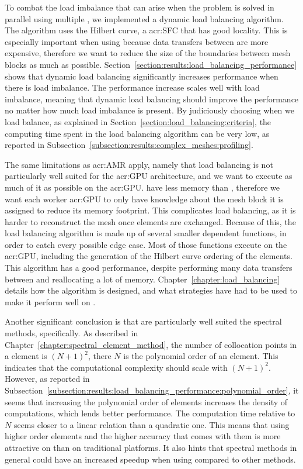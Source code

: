 To combat the load imbalance that can arise when the problem is solved in parallel using multiple
, we implemented a dynamic load balancing algorithm. The algorithm uses the
Hilbert curve, a \acrlong{acr:SFC} that has good locality. This is especially important when using
 because data transfers between  are more expensive,
therefore we want to reduce the size of the boundaries between mesh blocks as much as possible.
Section~\ref{section:results:load_balancing_performance} shows that dynamic load balancing
significantly increases performance when there is load imbalance. The performance increase scales
well with load imbalance, meaning that dynamic load balancing should improve the performance no
matter how much load imbalance is present. By judiciously choosing when we load balance, as
explained in Section~\ref{section:load_balancing:criteria}, the computing time spent in the load
balancing algorithm can be very low, as reported in
Subsection~\ref{subsection:results:complex_meshes:profiling}. 

The same limitations as \acrshort{acr:AMR} apply, namely that load balancing is not particularly
well suited for the \acrshort{acr:GPU} architecture, and we want to execute as much of it as
possible on the \acrshort{acr:GPU}.  have less memory than ,
therefore we want each worker \acrshort{acr:GPU} to only have knowledge about the mesh block it is
assigned to reduce its memory footprint. This complicates load balancing, as it is harder to
reconstruct the mesh once elements are exchanged. Because of this, the load balancing algorithm is
made up of several smaller dependent functions, in order to catch every possible edge case. Most of
those functions execute on the \acrshort{acr:GPU}, including the generation of the Hilbert curve
ordering of the elements. This algorithm has a good performance, despite performing many data
transfers between  and reallocating a lot of memory.
Chapter~\ref{chapter:load_balancing} details how the algorithm is designed, and what strategies have
had to be used to make it perform well on .

Another significant conclusion is that  are particularly well suited the
spectral methods, specifically. As described in Chapter~\ref{chapter:spectral_element_method}, the
number of collocation points in a element is \({\left( N + 1 \right)}^2\), there \(N\) is the
polynomial order of an element. This indicates that the computational complexity should scale with
\({\left( N + 1 \right)}^2\). However, as reported in
Subsection~\ref{subsection:results:load_balancing_performance:polynomial_order}, it seems that
increasing the polynomial order of elements increases the density of computations, which lends
better performance. The computation time relative to \(N\) seems closer to a linear relation than a
quadratic one. This means that using higher order elements and the higher accuracy that comes with
them is more attractive on  than on traditional platforms. It also hints that
spectral methods in general could have an increased speedup when using  compared
to other methods.

